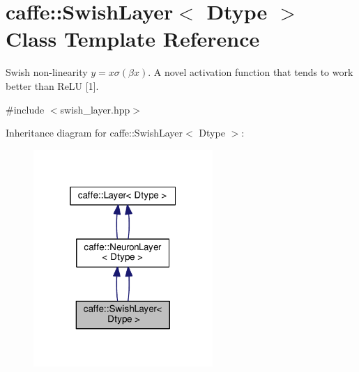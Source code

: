 \hypertarget{classcaffe_1_1_swish_layer}{}\section{caffe\+:\+:Swish\+Layer$<$ Dtype $>$ Class Template Reference}
\label{classcaffe_1_1_swish_layer}


Swish non-\/linearity $ y = x \sigma (\beta x) $. A novel activation function that tends to work better than Re\+LU \mbox{[}1\mbox{]}.  




{\ttfamily \#include $<$swish\+\_\+layer.\+hpp$>$}



Inheritance diagram for caffe\+:\+:Swish\+Layer$<$ Dtype $>$\+:
\nopagebreak
\begin{figure}[H]
\begin{center}
\leavevmode
\includegraphics[width=193pt]{classcaffe_1_1_swish_layer__inherit__graph}
\end{center}
\end{figure}
